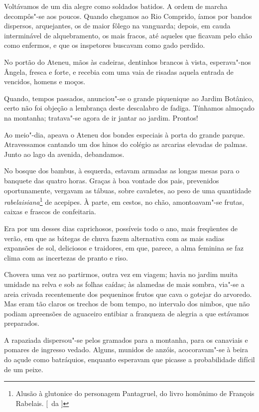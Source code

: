 Voltávamos de um dia alegre como soldados batidos. A ordem de marcha
decompôs"-se aos poucos. Quando chegamos ao Rio Comprido, íamos por
bandos dispersos, arquejantes, os de maior fôlego na
vanguarda; depois, em cauda interminável de alquebramento, os mais
fracos, até aqueles que ficavam pelo chão como enfermos, e que os
inspetores buscavam como gado perdido. 

No portão do Ateneu, mãos às
cadeiras, dentinhos brancos à vista, esperava"-nos Ângela, fresca e
forte, e recebia com uma vaia de risadas aquela entrada de vencidos,
homens e moços. 

Quando, tempos passados, anunciou"-se o grande
piquenique ao Jardim Botânico, certo não foi objeção a lembrança deste
descalabro de fadiga. Tínhamos almoçado na montanha; tratava"-se agora
de ir jantar ao jardim. Prontos! 

Ao meio"-dia, apeava o Ateneu dos
bondes especiais à porta do grande parque. Atravessamos cantando um dos
hinos do colégio as arcarias elevadas de palmas. Junto ao lago da
avenida, debandamos. 

No bosque dos bambus, à esquerda, estavam armadas
as longas mesas para o banquete das quatro horas. Graças à boa vontade
dos pais, prevenidos oportunamente, vergavam as tábuas, sobre
cavaletes, ao peso de uma quantidade \textit{rabelaisiana}\footnote{ Alusão à 
glutonice do personagem Pantagruel, do livro 
homônimo de François Rabelais. [~da ]} de acepipes. À parte,
em cestos, no chão, amontoavam"-se frutas, caixas e frascos de confeitaria. 

Era por um desses dias caprichosos, possíveis todo o ano,
mais freqüentes de verão, em que as bátegas de chuva fazem alternativa
com as mais sadias expansões de sol, deliciosos e traidores, em que,
parece, a alma feminina se faz clima com as incertezas de pranto e riso. 

Chovera uma vez ao partirmos, outra vez em viagem; havia no
jardim muita umidade na relva e sob as folhas caídas; às alamedas de
mais sombra, via"-se a areia crivada recentemente dos pequeninos
frutos que cava o gotejar do arvoredo. Mas eram tão claros os trechos
de bom tempo, no intervalo dos nimbos, que não podiam apreensões de
aguaceiro entibiar a franqueza de alegria a que estávamos preparados. 

A rapaziada dispersou"-se pelos gramados para a montanha, para os
canaviais e pomares de ingresso vedado. Alguns, munidos de anzóis,
acocoravam"-se à beira do açude como batráquios, enquanto esperavam
que picasse a probabilidade difícil de um peixe. 

